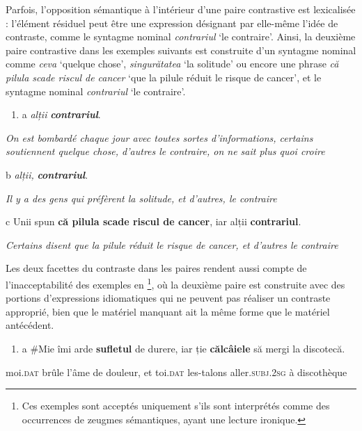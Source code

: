 Parfois, l'opposition sémantique à l'intérieur d'une paire contrastive est lexicalisée : l'élément résiduel peut être une expression désignant par elle-même l'idée de contraste, comme le syntagme nominal \textit{contrariul} `le contraire'. Ainsi, la deuxième paire contrastive dans les exemples suivants est construite d'un syntagme nominal comme \textit{ceva} `quelque chose', \textit{singurătatea} `la solitude' ou encore une phrase \textit{că pilula scade riscul de cancer} `que la pilule réduit le risque de cancer', et le syntagme nominal \textit{contrariul} `le contraire'.  


\begin{enumerate}
\item a   \textstyleapplestylespan{} \textstyleapplestylespan{,}{~}\emph{\textup{alții}}\emph{\textbf{\textup{ contrariul}}}.


\end{enumerate}
{\itshape
On est bombardé chaque jour avec toutes sortes d'informations, certains soutiennent quelque chose, d'autres le contraire, on ne sait plus quoi croire } 

  b   \textstyleapplestylespan{} \emph{\textup{alții,}}\emph{\textbf{\textup{ contrariul}}}. 

    \textit{Il y a des gens qui préfèrent la solitude, et d'autres, le contraire}

  c  Unii spun \textbf{că pilula scade riscul de cancer}, iar alții \textbf{contrariul}. 

    \textit{Certains disent que la pilule réduit le risque de cancer, et d'autres le contraire } 

Les deux facettes du contraste dans les paires rendent aussi compte de l'inacceptabilité des exemples en \footnote{Ces exemples sont acceptés uniquement s'ils sont interprétés comme des occurrences de zeugmes sémantiques, ayant une lecture ironique.}, où la deuxième paire est construite avec des portions d'expressions idiomatiques qui ne peuvent pas réaliser un contraste approprié, bien que le matériel manquant ait la même forme que le matériel antécédent.


\begin{enumerate}
\item \label{bkm:Ref289603838}a  \#Mie îmi arde \textbf{sufletul} de durere, iar ție \textbf{călcâiele} să mergi la discotecă.


\end{enumerate}
moi.\textsc{dat} brûle l'âme de douleur, et toi.\textsc{dat} les-talons aller\textsc{.subj.2sg} à discothèque

